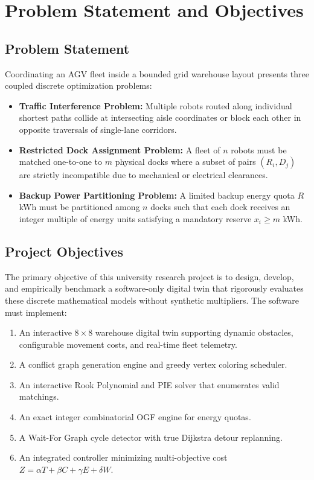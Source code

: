 \documentclass[conference]{IEEEtran}
\begin{document}
\section{Problem Statement and Objectives}
\subsection{Problem Statement}
Coordinating an AGV fleet inside a bounded grid warehouse layout presents three coupled discrete optimization problems:
\begin{itemize}
    \item \textbf{Traffic Interference Problem:} Multiple robots routed along individual shortest paths collide at intersecting aisle coordinates or block each other in opposite traversals of single-lane corridors.
    \item \textbf{Restricted Dock Assignment Problem:} A fleet of $n$ robots must be matched one-to-one to $m$ physical docks where a subset of pairs $(R_i, D_j)$ are strictly incompatible due to mechanical or electrical clearances.
    \item \textbf{Backup Power Partitioning Problem:} A limited backup energy quota $R$ kWh must be partitioned among $n$ docks such that each dock receives an integer multiple of energy units satisfying a mandatory reserve $x_i \ge m$ kWh.
\end{itemize}

\subsection{Project Objectives}
The primary objective of this university research project is to design, develop, and empirically benchmark a software-only digital twin that rigorously evaluates these discrete mathematical models without synthetic multipliers. The software must implement:
\begin{enumerate}
    \item An interactive $8 \times 8$ warehouse digital twin supporting dynamic obstacles, configurable movement costs, and real-time fleet telemetry.
    \item A conflict graph generation engine and greedy vertex coloring scheduler.
    \item An interactive Rook Polynomial and PIE solver that enumerates valid matchings.
    \item An exact integer combinatorial OGF engine for energy quotas.
    \item A Wait-For Graph cycle detector with true Dijkstra detour replanning.
    \item An integrated controller minimizing multi-objective cost $Z = \alpha T + \beta C + \gamma E + \delta W$.
\end{enumerate}
\end{document}

